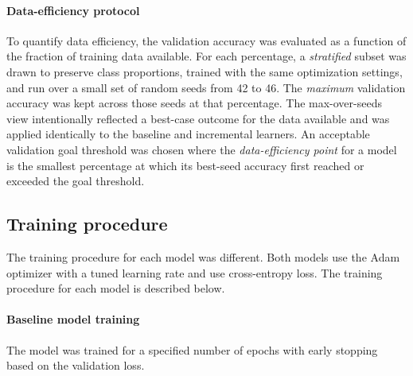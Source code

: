 \documentclass[conference]{IEEEtran}
\begin{document}
\paragraph{Data-efficiency protocol}
To quantify data efficiency, the validation accuracy was evaluated as a function of the fraction of training data available. For each 
percentage, a \emph{stratified} subset was drawn to preserve class proportions, trained with the same optimization settings, and  
run over a small set of random seeds from 42 to 46. The \emph{maximum} validation accuracy was kept across those seeds at that 
percentage. The max-over-seeds view intentionally reflected a best-case outcome for the data available and was applied identically to 
the baseline and incremental learners. An acceptable validation goal threshold was chosen where the \emph{data-efficiency point} 
for a model is the smallest percentage at which its best-seed accuracy first reached or exceeded the goal threshold.

\subsection{Training procedure}
The training procedure for each model was different. Both models use the Adam optimizer \cite{kingma2015adam} with a tuned learning rate and use cross-entropy loss. The training procedure for each model is described below.
\paragraph{Baseline model training}
The model was trained for a specified 
number of epochs with early stopping based on the validation loss. 
\end{document}
